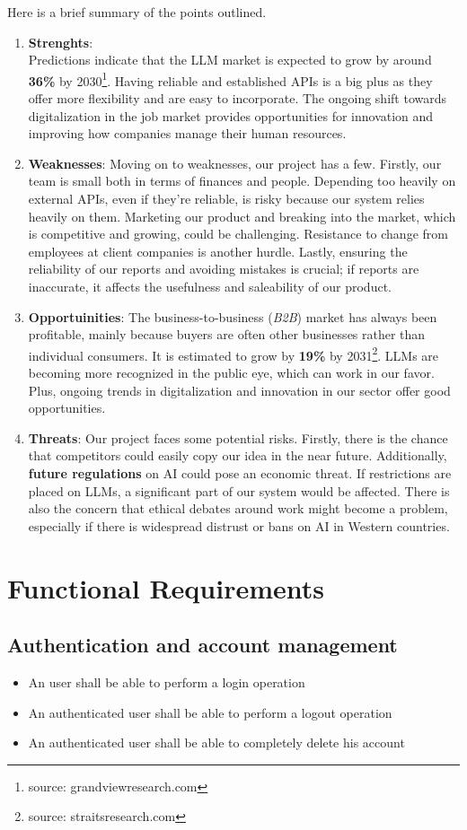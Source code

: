 \documentclass{article}
\begin{document}
Here is a brief summary of the points outlined.
\begin{enumerate}
    \item \textbf{Strenghts}:\\
Predictions indicate that the LLM market is expected to grow by around \textbf{36\%} by 2030\footnote{source: grandviewresearch.com}. Having reliable and established APIs is a big plus as they offer more flexibility and are easy to incorporate. The ongoing shift towards digitalization in the job market provides opportunities for innovation and improving how companies manage their human resources.
    \item \textbf{Weaknesses}:
Moving on to weaknesses, our project has a few. Firstly, our team is small both in terms of finances and people. Depending too heavily on external APIs, even if they're reliable, is risky because our system relies heavily on them. Marketing our product and breaking into the market, which is competitive and growing, could be challenging. Resistance to change from employees at client companies is another hurdle. Lastly, ensuring the reliability of our reports and avoiding mistakes is crucial; if reports are inaccurate, it affects the usefulness and saleability of our product.
    \item \textbf{Opportuinities}:
The business-to-business (\textit{B2B}) market has always been profitable, mainly because buyers are often other businesses rather than individual consumers. It is estimated to grow by \textbf{19\%} by 2031\footnote{source: straitsresearch.com}. LLMs are becoming more recognized in the public eye, which can work in our favor. Plus, ongoing trends in digitalization and innovation in our sector offer good opportunities.
    \item \textbf{Threats}:
Our project faces some potential risks. Firstly, there is the chance that competitors could easily copy our idea in the near future. Additionally, \textbf{future regulations} on AI could pose an economic threat. If restrictions are placed on LLMs, a significant part of our system would be affected. There is also the concern that ethical debates around work might become a problem, especially if there is widespread distrust or bans on AI in Western countries.
\end{enumerate}


\section{Functional Requirements}
\subsection{Authentication and account management}
\begin{itemize}
    \item An user shall be able to perform a login operation
    \item An authenticated user shall be able to perform a logout operation
    \item An authenticated user shall be able to completely delete his account
\end{itemize}
\end{document}
